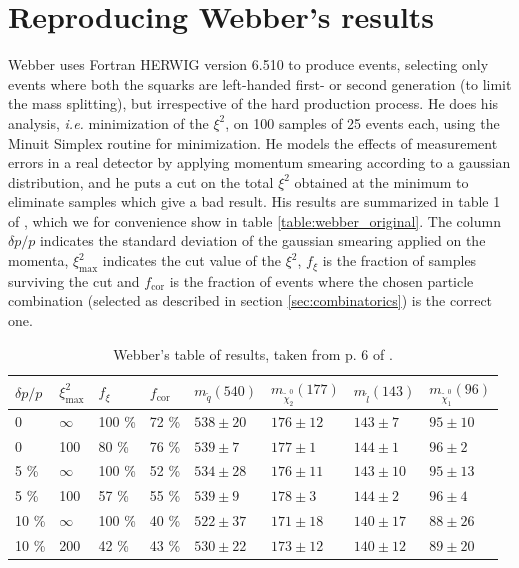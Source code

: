 \documentclass[twoside,english]{uiofysmaster}
\begin{document}
\section{Reproducing Webber's results}
Webber uses Fortran {\scshape HERWIG} version 6.510 \cite{Corcella:2000bw,Moretti:2002eu} to produce events, selecting only events where both the squarks are left-handed first- or second generation (to limit the mass splitting), but irrespective of the hard production process. He does his analysis, {\it i.e.} minimization of the $\xi^2$, on 100 samples of 25 events each, using the Minuit Simplex \cite{James:1975dr} routine for minimization. He models the effects of measurement errors in a real detector by applying momentum smearing according to a gaussian distribution, and he puts a cut on the total $\xi^2$ obtained at the minimum to eliminate samples which give a bad result. His results are summarized in table 1 of \cite{Webber:2009vm}, which we for convenience show in table \vref{table:webber_original}. The column $\delta p/p$ indicates the standard deviation of the gaussian smearing applied on the momenta, $\xi^2_\mathrm{max}$ indicates the cut value of the $\xi^2$, $f_\xi$ is the fraction of samples surviving the cut and $f_\mathrm{cor}$ is the fraction of events where the chosen particle combination (selected as described in section \ref{sec:combinatorics}) is the correct one. 


\begin{table}[hbt]
	\centering
	\begin{tabular}{| l | l | l | l  || l | l | l | l |}
		\hline
		$\delta p/p$ & $\xi^2_\mathrm{max}$ & $f_\xi$ & $f_\mathrm{cor}$ & $m_{\tilde q} (540)$ & $m_{\tilde \chi_2^0} (177)$ & $m_{\tilde l} (143)$ & $m_{\tilde \chi_1^0} (96)$ \\
		\hline \hline
		0 & 	$\infty$ &	100 \%	& 72 \%	& $538 \pm 20$	&	$176 \pm 12$	&	$143 \pm 7$	& 	$95 \pm 10$	\\
		0 &		100 &		80 \%	& 76 \% & $539 \pm 7$	&	$177 \pm 1$		&	$144 \pm 1$	&	$96 \pm 2$	\\
		5 \% &	$\infty$ &	100 \%	& 52 \% & $534 \pm 28$	& 	$176 \pm 11$	&	$143 \pm 10$&	$95 \pm 13$ \\
		5 \% &	100 &		57 \%	& 55 \% & $539 \pm 9$	&	$178 \pm 3$		& 	$144 \pm 2$	&	$96 \pm 4$	\\
		10 \% &	$\infty$ &	100 \%	& 40 \% & $522 \pm 37$	&	$171 \pm 18$	&	$140 \pm 17$&	$88 \pm 26$	\\
		10 \% &	200 &		42 \%	& 43 \% & $530 \pm 22$	& 	$173 \pm 12$	&	$140 \pm 12$&	$89 \pm 20$ \\
		\hline
	\end{tabular}
	\caption{Webber's table of results, taken from p. 6 of \cite{Webber:2009vm}.}
	\label{table:webber_original}
\end{table}
\end{document}

